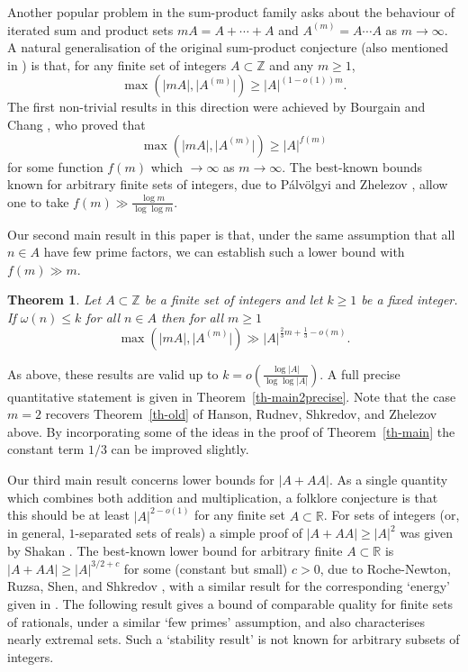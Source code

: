 \documentclass{amsart}
\renewcommand{\leq}{\leqslant}
\renewcommand{\geq}{\geqslant}
\newcommand{\bbz}{\mathbb{Z}}
\newcommand{\bbr}{\mathbb{R}}
\newcommand{\abs}[1]{\left\lvert #1\right\rvert}
\newcommand{\Abs}[1]{\lvert #1\rvert}
\newtheorem{theorem}{Theorem}
\theoremstyle{definition}
\begin{document}
Another popular problem in the sum-product family asks about the behaviour of iterated sum and product sets $mA=A+\cdots+A$ and $A^{(m)}=A\cdots A$ as $m\to \infty$. A natural generalisation of the original sum-product conjecture (also mentioned in \cite{ErSz83}) is that, for any finite set of integers $A\subset \bbz$ and any $m\geq 1$,
\[\max(\abs{mA},\Abs{A^{(m)}})\geq \abs{A}^{(1-o(1))m}.\]
The first non-trivial results in this direction were achieved by Bourgain and Chang \cite{BoCh04}, who proved that 
\[\max(\abs{mA},\Abs{A^{(m)}})\geq \abs{A}^{f(m)}\]
for some function $f(m)$ which $\to \infty$ as $m\to \infty$. The best-known bounds known for arbitrary finite sets of integers, due to P\'alv\"olgyi and Zhelezov \cite{PaZh21}, allow one to take $f(m)\gg \frac{\log m}{\log\log m}$.

Our second main result in this paper is that, under the same assumption that all $n\in A$ have few prime factors, we can establish such a lower bound with $f(m)\gg m$.
\begin{theorem}\label{th-main2}
Let $A\subset \bbz$ be a finite set of integers and let $k\geq 1$ be a fixed integer. If $\omega(n)\leq k$ for all $n\in A$ then for all $m\geq 1$
\[\max(\abs{mA},\Abs{A^{(m)}})\gg \abs{A}^{\frac{2}{3}m+\frac{1}{3}-o(m)}.\]
\end{theorem}
As above, these results are valid up to $k=o(\frac{\log \abs{A}}{\log\log \abs{A}})$. A full precise quantitative statement is given in Theorem~\ref{th-main2precise}. Note that the case $m=2$ recovers Theorem~\ref{th-old} of Hanson, Rudnev, Shkredov, and Zhelezov above. By incorporating some of the ideas in the proof of Theorem~\ref{th-main} the constant term $1/3$ can be improved slightly.

Our third main result concerns lower bounds for $\abs{A+AA}$. As a single quantity which combines both addition and multiplication, a folklore conjecture is that this should be at least $\abs{A}^{2-o(1)}$ for any finite set $A\subset \bbr$. For sets of integers (or, in general, $1$-separated sets of reals) a simple proof of $\abs{A+AA}\geq \abs{A}^2$ was given by Shakan \cite{Sh}. The best-known lower bound for arbitrary finite $A\subset \bbr$ is $\abs{A+AA}\geq \abs{A}^{3/2+c}$ for some (constant but small) $c>0$, due to Roche-Newton, Ruzsa, Shen, and Shkredov \cite{RRSS19}, with a similar result for the corresponding `energy' given in \cite[Theorem 9]{RuSh22}. The following result gives a bound of comparable quality for finite sets of rationals, under a similar `few primes' assumption, and also characterises nearly extremal sets. Such a `stability result' is not known for arbitrary subsets of integers.
\end{document}
